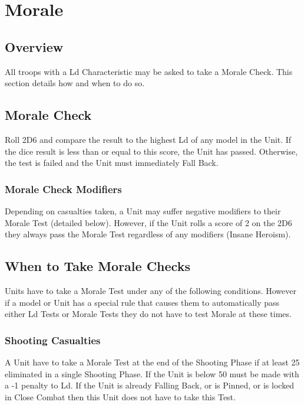 
\chapter{Morale}

\section{Overview}

All troops with a Ld Characteristic may be asked to take a
Morale Check. This section details how and when to do so.

\section{Morale Check}
Roll 2D6 and compare the result to the highest Ld of any
model in the Unit. If the dice result is less than or equal to this
score, the Unit has passed. Otherwise, the test is failed and
the Unit must immediately Fall Back.

\subsection{Morale Check Modifiers}

Depending on casualties taken, a Unit may suffer negative
modifiers to their Morale Test (detailed below). However, if the
Unit rolls a score of 2 on the 2D6 they always pass the Morale
Test regardless of any modifiers (Insane Heroism).

\section{When to Take Morale Checks}
Units have to take a Morale Test under any of the following
conditions. However if a model or Unit has a special rule that
causes them to automatically pass either Ld Tests or Morale
Tests they do not have to test Morale at these times.


\subsection{Shooting Casualties}
A Unit have to take a Morale Test at the end of the Shooting
Phase if at least 25%
eliminated in a single Shooting Phase.
If the Unit is below 50%
must be made with a -1 penalty to Ld. If the Unit is already
Falling Back, or is Pinned, or is locked in Close Combat then
this Unit does not have to take this Test.


